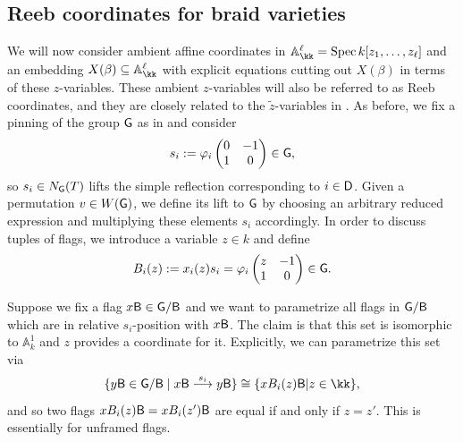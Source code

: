 \subsection{Reeb coordinates for braid varieties}\label{ssec:Reeb_coordinates_braid_variety} We will now consider ambient affine coordinates in $\mathbb{A}_\kk^{\ell}=\Spec k[z_1,\ldots,z_\ell]$ and an embedding $X(\beta)\sse \mathbb{A}_\kk^{\ell}$ with explicit equations cutting out $X(\beta)$ in terms of these $z$-variables. These ambient $z$-variables will also be referred to as Reeb coordinates, and they are closely related to the $\widetilde{z}$-variables in . As before, we fix a pinning of the group $\mathsf{G}$ as in  and consider
\[
s_{i} := \varphi_{i}\left(\begin{matrix}0 & -1 \\ 1 & 0 \end{matrix} \right)\in \mathsf{G},
\]
so $s_{i} \in N_{\mathsf{G}}(T)$ lifts the simple reflection corresponding to $i \in \mathsf{D}$. Given a permutation $v\in W(\mathsf{G})$, we define its lift to $\mathsf{G}$ by choosing an arbitrary reduced expression and multiplying these elements $s_i$ accordingly. In order to discuss tuples of flags, we introduce a variable $z \in k$ and define
\[
B_{i}(z):= x_{i}(z)s_{i} = \varphi_{i}\left(\begin{matrix} z & -1 \\ 1 & 0\end{matrix}\right) \in \mathsf{G}.
\]

 Suppose we fix a flag $x\mathsf{B} \in \mathsf{G}/\mathsf{B}$ and we want to parametrize all flags in $\mathsf{G}/\mathsf{B}$ which are in relative $s_i$-position with $x\mathsf{B}$. The claim is that this set is isomorphic to $\mathbb{A}_k^1$ and $z$ provides a coordinate for it. Explicitly, we can parametrize this set via
\begin{equation}\label{eq:Biz_parametrizing_flags_rel_pos}
\{y\borel \in \G/\borel \mid x\borel \buildrel s_{i} \over \longrightarrow y\borel\}\cong \{xB_{i}(z)\borel | z \in \kk\},
\end{equation}
and so two flags $xB_i(z)\mathsf{B}=xB_i(z')\mathsf{B}$ are equal if and only if $z=z'$. This is essentially  for unframed flags.

